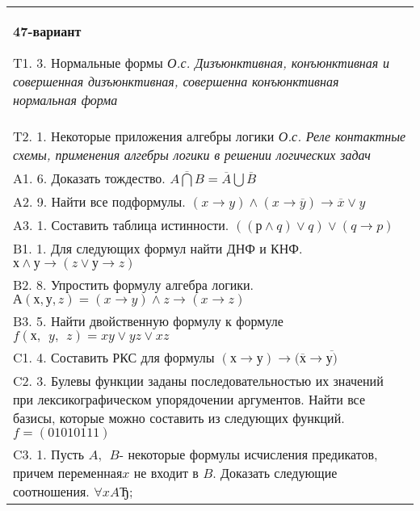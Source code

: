 \documentclass{article}
\begin{document}
\begin{tabular}{m{17cm}}
\textbf{47-вариант}
\newline

T1. 3. Нормальные формы \emph{О.с. Дизъюнктивная, конъюнктивная и совершенная дизъюнктивная, совершенна конъюнктивная нормальная форма} \\
T2. 1. Некоторые приложения алгебры логики \emph{О.с. Реле контактные схемы, применения алгебры логики в решении логических задач} \\
A1. 6. Доказать тождество. \(\overline{A\bigcap B} = \overline{A}\bigcup\overline{B}\) \\
A2. 9. Найти все подформулы. \((x \rightarrow y) \land (x \rightarrow \overline{y}) \rightarrow \overline{x} \vee y\) \\
A3. 1. Составить таблица истинности. \(\left( (р \land q) \vee q \right) \vee (q \rightarrow p)\) \\
B1. 1. Для следующих формул найти ДНФ и КНФ. \(х \land у \rightarrow (z \vee у \rightarrow z)\) \\
B2. 8. Упростить формулу алгебра логики. \(А(х,у,z) = (x \rightarrow y) \land z \rightarrow (x \rightarrow z)\) \\
B3. 5. Найти двойственную формулу к формуле \(f(х,\ \ y,\ \ z) = xy \vee yz \vee xz\) \\
C1. 4. Составить РКС для формулы \((х \rightarrow у) \rightarrow (\overline{х} \rightarrow \overline{у)}\) \\
C2. 3. Булевы функции заданы последовательностью их значений при лексикографическом упорядочении аргументов. Найти все базисы, которые можно составить из следующих функций. \(f = (01010111)\) \\
C3. 1. Пусть \(A,\ \ B\)- некоторые формулы исчисления предикатов, причем переменная\(x\) не входит в \(B\). Доказать следующие соотношения. \(\forall xAЂ\); \\

\end{tabular}
\vspace{1cm}
\end{document}

